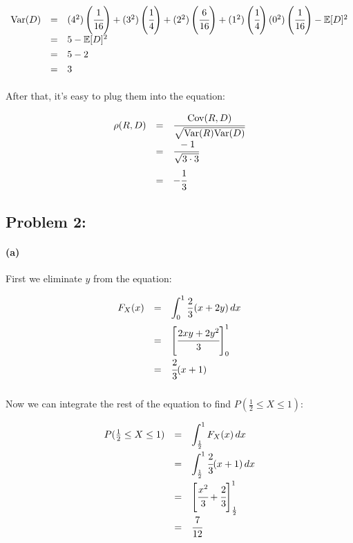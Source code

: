 \documentclass[a4paper]{article}
\begin{document}
\begin{equation}
\begin{array}{rll}
\mbox{Var}(D) & = & (4^2) \left( \cfrac{1}{16} \right) + (3^2) \left( \cfrac{1}{4} \right) + (2^2) \left( \cfrac{6}{16} \right) + (1^2) \left( \cfrac{1}{4} \right) (0^2) \left( \cfrac{1}{16} \right) - \mathbb{E}[D]^2 \\[.05in]
& = & 5 - \mathbb{E}[D]^2 \\[.05in]
& = & 5 - 2 \\[.05in]
& = & 3 \\[.05in]
\end{array}
\end{equation}

After that, it's easy to plug them into the equation:

\begin{equation}
\begin{array}{rll}
\rho(R,D) & = & \cfrac{\mbox{Cov}(R,D)}{\sqrt{\mbox{Var}(R)\mbox{Var}(D)}} \\[.05in]
& = & \cfrac{-1}{\sqrt{3 \cdot 3}} \\[.15in]
& = & -\cfrac{1}{3}
\end{array}
\end{equation}


\subsection*{Problem 2:}

\paragraph{(a)}

First we eliminate $y$ from the equation:

\begin{equation}
\begin{array}{rll}
F_X(x) & = & \displaystyle\int^1_{0} \frac{2}{3}(x+2y) \,dx \\[.15in]
& = & \left[ \cfrac{2xy+2y^2}{3} \right]^1_0 \\[.15in]
& = & \cfrac{2}{3}(x+1) \\[.15in]
\end{array}
\end{equation}

Now we can integrate the rest of the equation to find $P(\frac{1}{2} \le X \le 1)$:

\begin{equation}
\begin{array}{rll}
P(\frac{1}{2} \le X \le 1) & = & \displaystyle\int^1_{\frac{1}{2}}F_X(x) \,dx \\[.15in]
& = & \displaystyle\int^1_{\frac{1}{2}} \cfrac{2}{3}(x+1) \,dx \\[.15in]
& = & \left[ \cfrac{x^2}{3}+ \cfrac{2}{3} \right]^1_{\frac{1}{2}} \\[.15in]
& = & \cfrac{7}{12} \\[.15in]
\end{array}
\end{equation}
\end{document}
